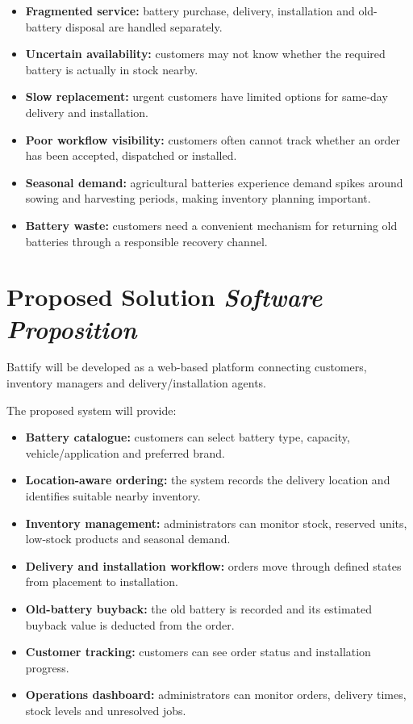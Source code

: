\documentclass[11pt,a4paper]{article}
\newcommand{\BvrHint}[1]{{\normalfont\normalsize\itshape\hfill #1}}
\begin{document}
\begin{itemize}[leftmargin=0.7cm]
    \item \textbf{Fragmented service:} battery purchase, delivery, installation
    and old-battery disposal are handled separately.
    \item \textbf{Uncertain availability:} customers may not know whether the
    required battery is actually in stock nearby.
    \item \textbf{Slow replacement:} urgent customers have limited options for
    same-day delivery and installation.
    \item \textbf{Poor workflow visibility:} customers often cannot track
    whether an order has been accepted, dispatched or installed.
    \item \textbf{Seasonal demand:} agricultural batteries experience demand
    spikes around sowing and harvesting periods, making inventory planning
    important.
    \item \textbf{Battery waste:} customers need a convenient mechanism for
    returning old batteries through a responsible recovery channel.
\end{itemize}

\section{Proposed Solution \BvrHint{Software Proposition}}

Battify will be developed as a web-based platform connecting customers,
inventory managers and delivery/installation agents.

The proposed system will provide:

\begin{itemize}[leftmargin=0.7cm]
    \item \textbf{Battery catalogue:} customers can select battery type,
    capacity, vehicle/application and preferred brand.
    \item \textbf{Location-aware ordering:} the system records the delivery
    location and identifies suitable nearby inventory.
    \item \textbf{Inventory management:} administrators can monitor stock,
    reserved units, low-stock products and seasonal demand.
    \item \textbf{Delivery and installation workflow:} orders move through
    defined states from placement to installation.
    \item \textbf{Old-battery buyback:} the old battery is recorded and its
    estimated buyback value is deducted from the order.
    \item \textbf{Customer tracking:} customers can see order status and
    installation progress.
    \item \textbf{Operations dashboard:} administrators can monitor orders,
    delivery times, stock levels and unresolved jobs.
\end{itemize}
\end{document}
